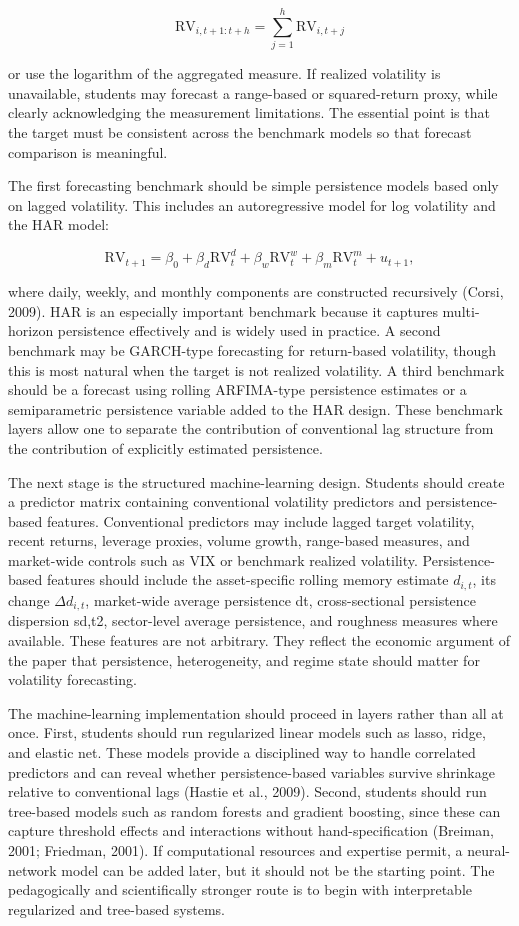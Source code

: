 \documentclass[12pt]{article}
\begin{document}
\[\mathrm{RV}_{i,t+1:t+h} = \sum_{j=1}^{h} \mathrm{RV}_{i,t+j}\]

or use the logarithm of the aggregated measure. If realized volatility is unavailable, students may forecast a range-based or squared-return proxy, while clearly acknowledging the measurement limitations. The essential point is that the target must be consistent across the benchmark models so that forecast comparison is meaningful.

The first forecasting benchmark should be simple persistence models based only on lagged volatility. This includes an autoregressive model for log volatility and the HAR model:

\[\mathrm{RV}_{t+1} = \beta_0 + \beta_d \mathrm{RV}_t^d + \beta_w \mathrm{RV}_t^w + \beta_m \mathrm{RV}_t^m + u_{t+1},\]

where daily, weekly, and monthly components are constructed recursively (Corsi, 2009). HAR is an especially important benchmark because it captures multi-horizon persistence effectively and is widely used in practice. A second benchmark may be GARCH-type forecasting for return-based volatility, though this is most natural when the target is not realized volatility. A third benchmark should be a forecast using rolling ARFIMA-type persistence estimates or a semiparametric persistence variable added to the HAR design. These benchmark layers allow one to separate the contribution of conventional lag structure from the contribution of explicitly estimated persistence.

The next stage is the structured machine-learning design. Students should create a predictor matrix containing conventional volatility predictors and persistence-based features. Conventional predictors may include lagged target volatility, recent returns, leverage proxies, volume growth, range-based measures, and market-wide controls such as VIX or benchmark realized volatility. Persistence-based features should include the asset-specific rolling memory estimate $d_{i,t}$, its change $\Delta d_{i,t}$, market-wide average persistence dt, cross-sectional persistence dispersion sd,t2, sector-level average persistence, and roughness measures where available. These features are not arbitrary. They reflect the economic argument of the paper that persistence, heterogeneity, and regime state should matter for volatility forecasting.

The machine-learning implementation should proceed in layers rather than all at once. First, students should run regularized linear models such as lasso, ridge, and elastic net. These models provide a disciplined way to handle correlated predictors and can reveal whether persistence-based variables survive shrinkage relative to conventional lags (Hastie et al., 2009). Second, students should run tree-based models such as random forests and gradient boosting, since these can capture threshold effects and interactions without hand-specification (Breiman, 2001; Friedman, 2001). If computational resources and expertise permit, a neural-network model can be added later, but it should not be the starting point. The pedagogically and scientifically stronger route is to begin with interpretable regularized and tree-based systems.
\end{document}
